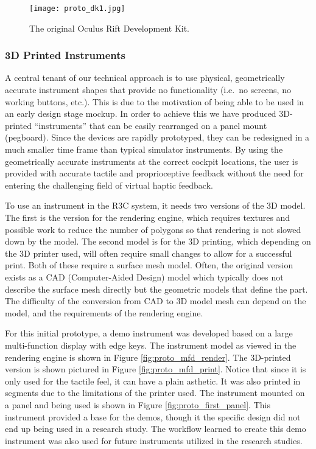 \begin{figure}
    \centering
    \texttt{[image: proto\_dk1.jpg]}
    \caption{The original Oculus Rift Development Kit.}
    \label{fig:proto_oculus}
\end{figure}

\subsubsection{3D Printed Instruments}

A central tenant of our technical approach is to use physical, geometrically accurate instrument shapes that provide no functionality (i.e.\ no screens, no working buttons, etc.).
This is due to the motivation of being able to be used in an early design stage mockup.
In order to achieve this we have produced 3D-printed ``instruments'' that can be easily rearranged on a panel mount (pegboard).
Since the devices are rapidly prototyped, they can be redesigned in a much smaller time frame than typical simulator instruments.
By using the geometrically accurate instruments at the correct cockpit locations, the user is provided with accurate tactile and proprioceptive feedback without the need for entering the challenging field of virtual haptic feedback.

To use an instrument in the R3C system, it needs two versions of the 3D model.
The first is the version for the rendering engine, which requires textures and possible work to reduce the number of polygons so that rendering is not slowed down by the model.
The second model is for the 3D printing, which depending on the 3D printer used, will often require small changes to allow for a successful print.
Both of these require a surface mesh model.
Often, the original version exists as a CAD (Computer-Aided Design) model which typically does not describe the surface mesh directly but the geometric models that define the part.
The difficulty of the conversion from CAD to 3D model mesh can depend on the model, and the requirements of the rendering engine.

For this initial prototype, a demo instrument was developed based on a large multi-function display with edge keys.
The instrument model as viewed in the rendering engine is shown in Figure \ref{fig:proto_mfd_render}.
The 3D-printed version is shown pictured in Figure \ref{fig:proto_mfd_print}.
Notice that since it is only used for the tactile feel, it can have a plain asthetic.
It was also printed in segments due to the limitations of the printer used.
The instrument mounted on a panel and being used is shown in Figure \ref{fig:proto_first_panel}.
This instrument provided a base for the demos, though it the specific design did not end up being used in a research study.
The workflow learned to create this demo instrument was also used for future instruments utilized in the research studies.

